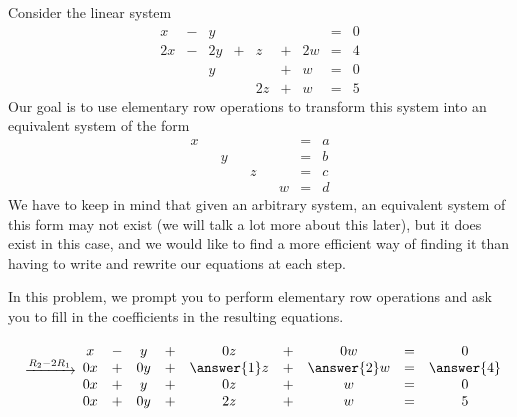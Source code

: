 \documentclass{ximera}
\begin{document}
\begin{exploration}\label{init:augmentedmatrixex}
Consider the linear system
\begin{equation}\label{eq:sys20originalsystem1}
\begin{array}{ccccccccc}
      x &- &y&&&&&= &0 \\
	 2x& -&2y&+&z&+&2w&=&4\\
     & &y&&&+&w&=&0\\
     & &&&2z&+&w&=&5
    \end{array}
\end{equation}
Our goal is to use elementary row operations to transform this system into an equivalent system of the form
\begin{equation*}
\begin{array}{ccccccccc}
     x & &&&&&&= &a \\
	 & &y&&&&&=&b\\
    & &&&z&&&=&c\\
    & &&&&&w&=&d
  \end{array}
   \end{equation*}
 We have to keep in mind that given an arbitrary system, an equivalent system of this form may not exist (we will talk a lot more about this later), but it does exist in this case, and we would like to find a more efficient way of finding it than having to write and rewrite our equations at each step.   
 
In this problem, we prompt you to perform elementary row operations and ask you to fill in the coefficients in the resulting equations.

$$\begin{array}{c}
 \\
 \xrightarrow{R_2-2R_1}\\
\\
\\
\end{array}
\begin{matrix}
      x &- &y&+&0z&+&0w&= &0 \\
 0x& +&0y&+&\answer{1}z&+&\answer{2}w&=&\answer{4}\\
    0x& +&y&+&0z&+&w&=&0\\
     0x&+&0y&+&2z&+&w&=&5
    \end{matrix}$$
    
 


\end{exploration}
\end{document}
